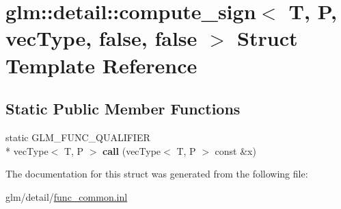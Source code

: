 \hypertarget{structglm_1_1detail_1_1compute__sign_3_01T_00_01P_00_01vecType_00_01false_00_01false_01_4}{\section{glm\-:\-:detail\-:\-:compute\-\_\-sign$<$ T, P, vec\-Type, false, false $>$ Struct Template Reference}
\label{structglm_1_1detail_1_1compute__sign_3_01T_00_01P_00_01vecType_00_01false_00_01false_01_4}
}
\subsection*{Static Public Member Functions}
\begin{DoxyCompactItemize}
\item 
\hypertarget{structglm_1_1detail_1_1compute__sign_3_01T_00_01P_00_01vecType_00_01false_00_01false_01_4_a3d6c5553fb7cdb70bc5349b2b7c8c822}{static G\-L\-M\-\_\-\-F\-U\-N\-C\-\_\-\-Q\-U\-A\-L\-I\-F\-I\-E\-R \\*
vec\-Type$<$ T, P $>$ {\bfseries call} (vec\-Type$<$ T, P $>$ const \&x)}\label{structglm_1_1detail_1_1compute__sign_3_01T_00_01P_00_01vecType_00_01false_00_01false_01_4_a3d6c5553fb7cdb70bc5349b2b7c8c822}

\end{DoxyCompactItemize}


The documentation for this struct was generated from the following file\-:\begin{DoxyCompactItemize}
\item 
glm/detail/\hyperlink{func__common_8inl}{func\-\_\-common.\-inl}\end{DoxyCompactItemize}
